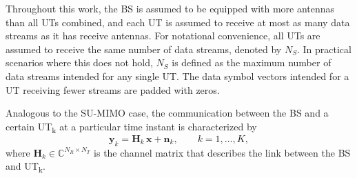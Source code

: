 Throughout this work, the \ac{BS} is assumed to be equipped with more antennas than all \acp{UT} combined, and each \ac{UT} is assumed to receive at most as many data streams as it has receive antennas.
For notational convenience, all \acp{UT} are assumed to receive the same number of data streams, denoted by $N_S$. In practical scenarios where this does not hold, $N_S$ is defined as the maximum number of data streams intended for any single \ac{UT}. The data symbol vectors intended for a \ac{UT} receiving fewer streams are padded with zeros.

Analogous to the \ac{SU}-\ac{MIMO} case, the communication between the \ac{BS} and a certain \ac{UT}\textsubscript{k} at a particular time instant is characterized by
\begin{equation}
    \mathbf{y}_k = \mathbf{H}_k \, \mathbf{x} + \mathbf{n}_k, \qquad k = 1, \dots, K,
\label{eq:mu_mimo_io}
\end{equation}
where $\mathbf{H}_k \in \mathbb{C}^{N_R \times N_T}$ is the channel matrix that describes the link between the \ac{BS} and \ac{UT}\textsubscript{k}.

